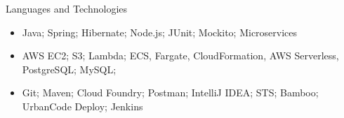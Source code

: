 \documentclass[]{mcdowellcv}
\begin{document}
    \makeheader

    \begin{cvsection}{Languages and Technologies}
        \begin{cvsubsection}{}{}{}
            \begin{itemize}
                \item Java; Spring; Hibernate; Node.js; JUnit; Mockito; Microservices
                \item  AWS EC2; S3; Lambda; ECS, Fargate, CloudFormation, AWS Serverless, PostgreSQL; MySQL;
                \item Git; Maven; Cloud Foundry; Postman; IntelliJ IDEA; STS; Bamboo; UrbanCode Deploy; Jenkins
            \end{itemize}
        \end{cvsubsection}
    \end{cvsection}
\end{document}
